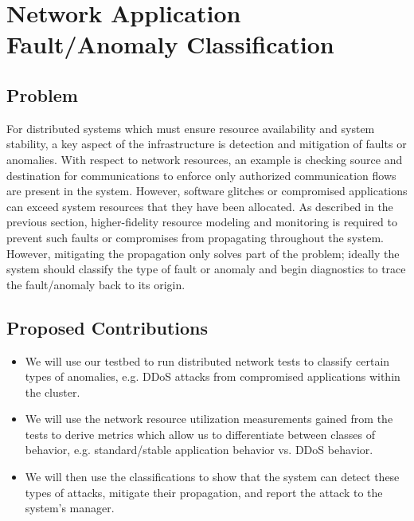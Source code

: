 \section{Network Application Fault/Anomaly Classification}
\label{sec:classification}

\subsection{Problem}
For distributed systems which must ensure resource availability and
system stability, a key aspect of the infrastructure is detection and
mitigation of faults or anomalies.  With respect to network resources,
an example is checking source and destination for communications to
enforce only authorized communication flows are present in the system.
However, software glitches or compromised applications can exceed
system resources that they have been allocated.  As described in the
previous section, higher-fidelity resource modeling and monitoring is
required to prevent such faults or compromises from propagating
throughout the system.  However, mitigating the propagation only
solves part of the problem; ideally the system should classify the
type of fault or anomaly and begin diagnostics to trace the
fault/anomaly back to its origin.

\subsection{Proposed Contributions}
\begin{itemize}
	\item We will use our testbed to run distributed network tests
          to classify certain types of anomalies, e.g. DDoS attacks
          from compromised applications within the cluster.
	\item We will use the network resource utilization
          measurements gained from the tests to derive metrics which
          allow us to differentiate between classes of behavior,
          e.g. standard/stable application behavior vs. DDoS behavior.
	\item We will then use the classifications to show that the
          system can detect these types of attacks, mitigate their
          propagation, and report the attack to the system's manager.
\end{itemize}
